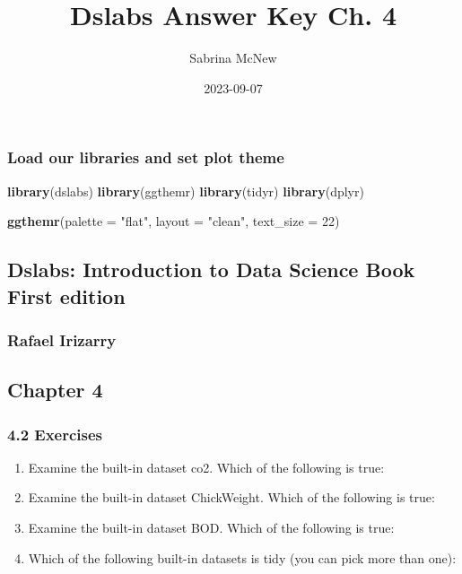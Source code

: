 \documentclass[
]{article}
\title{Dslabs Answer Key Ch. 4}
\author{Sabrina McNew}
\date{2023-09-07}
\newenvironment{Shaded}{\begin{snugshade}}{\end{snugshade}}
\newcommand{\AttributeTok}[1]{\textcolor[rgb]{0.13,0.29,0.53}{#1}}
\newcommand{\DecValTok}[1]{\textcolor[rgb]{0.00,0.00,0.81}{#1}}
\newcommand{\FunctionTok}[1]{\textcolor[rgb]{0.13,0.29,0.53}{\textbf{#1}}}
\newcommand{\NormalTok}[1]{#1}
\newcommand{\StringTok}[1]{\textcolor[rgb]{0.31,0.60,0.02}{#1}}
\providecommand{\tightlist}{%
  \setlength{\itemsep}{0pt}\setlength{\parskip}{0pt}}
\begin{document}
\maketitle

\hypertarget{load-our-libraries-and-set-plot-theme}{%
\subsubsection{Load our libraries and set plot
theme}\label{load-our-libraries-and-set-plot-theme}}

\begin{Shaded}
\begin{Highlighting}[]
\FunctionTok{library}\NormalTok{(dslabs)}
\FunctionTok{library}\NormalTok{(ggthemr)}
\FunctionTok{library}\NormalTok{(tidyr)}
\FunctionTok{library}\NormalTok{(dplyr)}

\FunctionTok{ggthemr}\NormalTok{(}\AttributeTok{palette =} \StringTok{"flat"}\NormalTok{, }\AttributeTok{layout =} \StringTok{"clean"}\NormalTok{, }\AttributeTok{text\_size =} \DecValTok{22}\NormalTok{)}
\end{Highlighting}
\end{Shaded}

\hypertarget{dslabs-introduction-to-data-science-book-first-edition}{%
\subsection{Dslabs: Introduction to Data Science Book First
edition}\label{dslabs-introduction-to-data-science-book-first-edition}}

\hypertarget{rafael-irizarry}{%
\subsubsection{Rafael Irizarry}\label{rafael-irizarry}}

\hypertarget{chapter-4}{%
\subsection{Chapter 4}\label{chapter-4}}

\hypertarget{exercises}{%
\subsubsection{4.2 Exercises}\label{exercises}}

\begin{enumerate}
\def\labelenumi{\arabic{enumi}.}
\tightlist
\item
  Examine the built-in dataset co2. Which of the following is true:
\item
  Examine the built-in dataset ChickWeight. Which of the following is
  true:
\item
  Examine the built-in dataset BOD. Which of the following is true:
\item
  Which of the following built-in datasets is tidy (you can pick more
  than one):
\end{enumerate}
\end{document}
